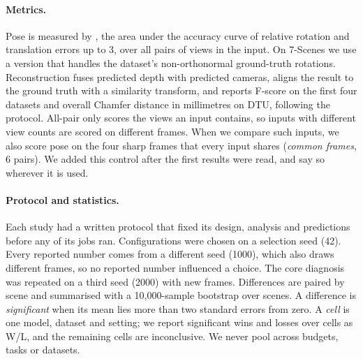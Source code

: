 \paragraph{Metrics.}
Pose is measured by \auc, the area under the accuracy curve of relative rotation and translation errors up to 3\textdegree, over all pairs of views in the input. On 7-Scenes we use a version that handles the dataset's non-orthonormal ground-truth rotations. Reconstruction fuses predicted depth with predicted cameras, aligns the result to the ground truth with a similarity transform, and reports F-score on the first four datasets and overall Chamfer distance in millimetres on DTU, following the \dathree protocol. All-pair \auc only scores the views an input contains, so inputs with different view counts are scored on different frames. When we compare such inputs, we also score pose on the four sharp frames that every input shares (\emph{common frames}, 6 pairs). We added this control after the first results were read, and say so wherever it is used.

\paragraph{Protocol and statistics.}
Each study had a written protocol that fixed its design, analysis and predictions before any of its jobs ran. Configurations were chosen on a selection seed (42). Every reported number comes from a different seed (1000), which also draws different frames, so no reported number influenced a choice. The core diagnosis was repeated on a third seed (2000) with new frames. Differences are paired by scene and summarised with a 10{,}000-sample bootstrap over scenes. A difference is \emph{significant} when its mean lies more than two standard errors from zero. A \emph{cell} is one model, dataset and setting; we report significant wins and losses over cells as W/L, and the remaining cells are inconclusive. We never pool across budgets, tasks or datasets.
